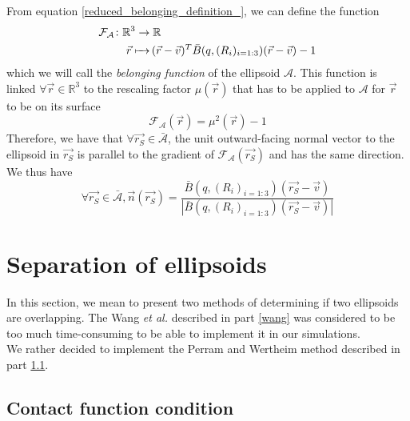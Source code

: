 \documentclass[class=report, float=false, crop=false]{standalone}
\begin{document}
From equation \ref{reduced_belonging_definition_}, we can define the function
\begin{equation}
\begin{aligned}\mathcal{F}_{\mathcal{A}} \colon &\mathbb{R}^3 \to \mathbb{R}\\     &\phantomarrow{\mathbb{R}^3}{\vec{r}} (\vec{r} - \vec{v})^T\bar{B}(q,(R_i)_{i=1:3})(\vec{r}-\vec{v}) - 1\end{aligned}
\label{belonging_function_reduced_}
\end{equation}
which we will call the \textit{belonging function} of the ellipsoid $\mathcal{A}$. This function is linked $\forall \vec{r} \in \mathbb{R}^3$ to the rescaling factor $\mu(\vec{r})$ that has to be applied to $\mathcal{A}$ for $\vec{r}$ to be on its surface
\begin{equation}
\boxed{
\mathcal{F}_{\mathcal{A}}(\vec{r}) = \mu^2(\vec{r}) - 1
}
\end{equation}
Therefore, we have that $\forall \vec{r_S} \in \bar{\mathcal{A}}$, the unit outward-facing normal vector to the ellipsoid in $\vec{r_S}$ is parallel to the gradient of $\mathcal{F}_{\mathcal{A}}(\vec{r_S})$ and has the same direction. We thus have
\begin{equation}
\boxed{
\forall \vec{r_S}\in \bar{\mathcal{A}}, \vec{n}(\vec{r_S}) = \frac{\bar{B}(q,(R_i)_{i=1:3})(\vec{r_S} - \vec{v})}{|\bar{B}(q,(R_i)_{i=1:3})(\vec{r_S} - \vec{v})|}
}
\label{surface_vec_reduced_}
\end{equation}

\section{Separation of ellipsoids}

In this section, we mean to present two methods of determining if two ellipsoids are overlapping. The Wang \textit{et al.} described in part \ref{wang} was considered to be too much time-consuming to be able to implement it in our simulations.\\

We rather decided to implement the Perram and Wertheim method described in part \ref{contact_function_condition}.\\

\subsection{Contact function condition}
\label{contact_function_condition}
\end{document}
